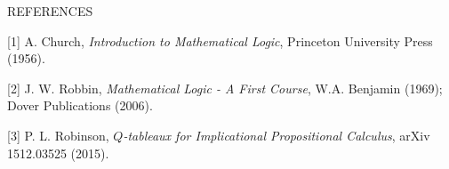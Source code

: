 \documentclass[10pt]{amsart}
\theoremstyle{plain}
\numberwithin{equation}{section}
\begin{document}
\bigbreak

\begin{center} 
{\small R}{\footnotesize EFERENCES}
\end{center} 
\medbreak 

[1]  A. Church, {\it Introduction to Mathematical Logic}, Princeton University Press (1956). 

[2] J. W. Robbin, {\it Mathematical Logic - A First Course}, W.A. Benjamin (1969); Dover Publications (2006).

[3] P. L. Robinson, {\it $Q$-tableaux for Implicational Propositional Calculus}, arXiv 1512.03525 (2015). 

\medbreak 
\end{document}
